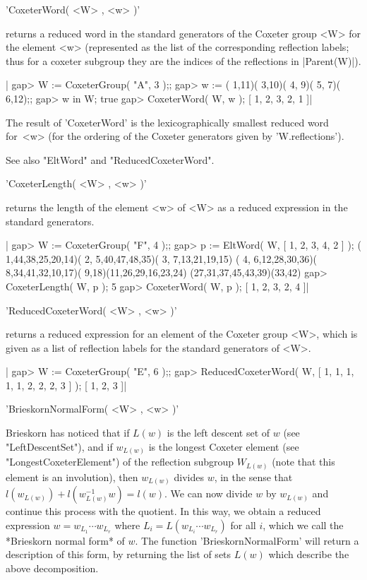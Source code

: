 'CoxeterWord( <W> , <w> )'

returns  a reduced word in the standard generators of the Coxeter group <W>
for  the element <w>  (represented as the  {\GAP} list of the corresponding
reflection  labels; thus for a coxeter subgroup they are the indices of the
reflections in |Parent(W)|).

|    gap> W := CoxeterGroup( "A", 3 );;
    gap> w := ( 1,11)( 3,10)( 4, 9)( 5, 7)( 6,12);;
    gap> w in W;
    true
    gap> CoxeterWord( W, w );
    [ 1, 2, 3, 2, 1 ]|

The result  of 'CoxeterWord'  is the lexicographically  smallest reduced
word  for~<w> (for  the  ordering  of the  Coxeter  generators given  by
'W.reflections').

See also "EltWord" and "ReducedCoxeterWord".


'CoxeterLength( <W> , <w> )'

returns the length of the element <w>  of <W> as a reduced expression in
the standard generators.

|    gap> W := CoxeterGroup( "F", 4 );;
    gap> p := EltWord( W, [ 1, 2, 3, 4, 2 ] );
    ( 1,44,38,25,20,14)( 2, 5,40,47,48,35)( 3, 7,13,21,19,15)
    ( 4, 6,12,28,30,36)( 8,34,41,32,10,17)( 9,18)(11,26,29,16,23,24)
    (27,31,37,45,43,39)(33,42)
    gap> CoxeterLength( W, p );
    5
    gap> CoxeterWord( W, p );
    [ 1, 2, 3, 2, 4 ]|


'ReducedCoxeterWord( <W> , <w> )'

returns a  reduced expression for an  element of the Coxeter  group <W>,
which is  given as a {\GAP}  list of reflection labels  for the standard
generators of <W>.

|    gap> W := CoxeterGroup( "E", 6 );;
    gap> ReducedCoxeterWord( W, [ 1, 1, 1, 1, 1, 2, 2, 2, 3 ] );
    [ 1, 2, 3 ]|


'BrieskornNormalForm( <W> , <w> )'

Brieskorn \cite{Bri71}  has noticed that  if $L(w)$ is the  left descent
set  of $w$  (see "LeftDescentSet"),  and if  $w_{L(w)}$ is  the longest
Coxeter element (see "LongestCoxeterElement") of the reflection subgroup
$W_{L(w)}$ (note that this  element is  an involution),  then $w_{L(w)}$
divides  $w$, in  the  sense that  $l(w_{L(w)})+l(w_{L(w)}^{-1}w)=l(w)$.
We  can  now  divide  $w$   by  $w_{L(w)}$  and  continue  this  process
with  the  quotient.  In  this  way,  we  obtain  a  reduced  expression
$w=w_{L_1}  \cdots w_{L_r}$  where $L_i=L(w_{L_i}  \cdots w_{L_r})$  for
all  $i$,  which  we  call  the *Brieskorn  normal  form*  of  $w$.  The
function 'BrieskornNormalForm'  will return a description  of this form,
by  returning  the  list  of   sets  $L(w)$  which  describe  the  above
decomposition.

